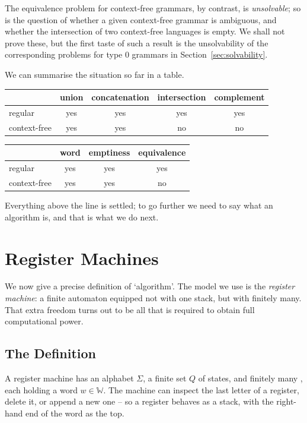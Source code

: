 \documentclass[a4paper]{scrartcl}
\newcommand{\WW}{\mathbb{W}}
\begin{document}
\begin{remark}
	The equivalence problem for context-free grammars, by contrast, is \emph{unsolvable}; so is the question of whether a given context-free grammar is ambiguous, and whether the intersection of two context-free languages is empty. We shall not prove these, but the first taste of such a result is the unsolvability of the corresponding problems for type $0$ grammars in Section~\ref{sec:solvability}.
\end{remark}

We can summarise the situation so far in a table.
\begin{center}
	\begin{tabular}{l|cccc}
		& union & concatenation & intersection & complement \\\hline
		regular & yes & yes & yes & yes \\
		context-free & yes & yes & no & no
	\end{tabular}
	\qquad
	\begin{tabular}{l|ccc}
		& word & emptiness & equivalence \\\hline
		regular & yes & yes & yes \\
		context-free & yes & yes & no
	\end{tabular}
\end{center}
Everything above the line is settled; to go further we need to say what an algorithm is, and that is what we do next.

\section{Register Machines}\label{sec:rm}

We now give a precise definition of `algorithm'. The model we use is the \emph{register machine}: a finite automaton equipped not with one stack, but with finitely many. That extra freedom turns out to be all that is required to obtain full computational power.

\subsection{The Definition}

A register machine has an alphabet $\Sigma$, a finite set $Q$ of states, and finitely many , each holding a word $w \in \WW$. The machine can inspect the last letter of a register, delete it, or append a new one -- so a register behaves as a stack, with the right-hand end of the word as the top.
\end{document}
